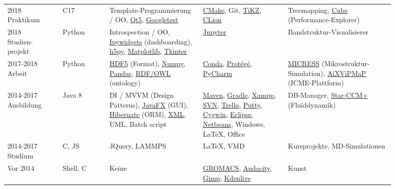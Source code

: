 \documentclass[11pt,a4paper]{moderncv}
\def\SymboCpp{C\raisebox{0.5ex}{\tiny\textbf{++}}}
\begin{document}
\begin{center}
{\begin{tabular}{p{0.13\linewidth} p{0.11\linewidth} >{\raggedright\arraybackslash}p{0.22\linewidth} >{\raggedright\arraybackslash}p{0.2\linewidth} >{\raggedright\arraybackslash}p{0.25\linewidth}}
      \makecell[l]{2018 \\ Praktikum} & \SymboCpp{}17 & Template-Programmierung / OO, \href{https://www.qt.io/}{Qt5}, \href{https://github.com/google/googletest}{Googletest} & \href{https://cmake.org/}{CMake}, Git, \href{https://texample.net/tikz/}{TiKZ}, \href{https://www.jetbrains.com/clion/}{CLion} & Treemapping, \href{https://www.scalasca.org/software/cube-4.x/}{Cube} (Performance-Explorer)\\
      \makecell[l]{2018 \\Studien- \\ projekt} & Python & Introspection / OO, \href{https://github.com/jupyter-widgets/ipywidgets}{Ipywidgets} (dashboarding), \href{https://www.h5py.org/}{h5py}, \href{https://matplotlib.org/}{Matplotlib}, \href{https://docs.python.org/3/library/tk.html}{Tkinter} & \href{https://jupyter.org/}{Jupyter} & Bandstruktur-Visualisierer\\
      \makecell[l]{2017-2018 \\ Arbeit} & Python & \href{https://www.hdfgroup.org/solutions/hdf5/}{HDF5} (Format), \href{https://numpy.org}{Numpy}, \href{https://pandas.pydata.org/}{Pandas}, \href{https://www.w3.org/OWL/}{RDF/OWL} (ontology) & \href{https://anaconda.org/conda-forge/}{Conda}, \href{https://protege.stanford.edu/}{Protégé}, \href{https://www.jetbrains.com/pycharm/}{PyCharm} & \href{https://micress.rwth-aachen.de/}{MICRESS} (Mikrostruktur-Simulation), \href{aixvipmap.de}{AiXViPMaP} (ICME-Plattform)\\
      2014-2017 Ausbildung & Java 8 & DI / MVVM (Design Patterns), \href{https://openjfx.io/}{JavaFX} (GUI), \href{https://hibernate.org/}{Hibernate} (ORM), \href{https://www.w3.org/TR/xml/}{XML}, UML, Batch script & \href{https://maven.apache.org/}{Maven}, \href{https://gradle.org/}{Gradle}, \href{https://www.apachefriends.org/index.html}{Xampp}, \href{https://subversion.apache.org/}{SVN}, \href{https://trello.com/}{Trello}, \href{https://www.putty.org/}{Putty}, \href{https://cygwin.com/}{Cygwin}, \href{https://www.eclipse.org/}{Eclipse}, \href{https://netbeans.apache.org//}{Netbeans}, Windows, \LaTeX{}, Office & DB-Manager, \href{https://www.plm.automation.siemens.com/global/en/products/simcenter/STAR-CCM.html}{Star-CCM+} (Fluiddynamik)\\
      2014-2017 Studium & \SymboCpp{}, JS & JQuery, LAMMPS & \LaTeX{}, VMD & Kursprojekte, MD-Simulationen\\
      Vor 2014 & Shell, \SymboCpp{} & Keine & \href{https://www.gromacs.org/}{GROMACS}, \href{https://www.audacityteam.org/}{Audacity}, \href{https://www.gimp.org}{Gimp}, \href{https://kdenlive.org}{Kdenlive} & Kunst\\
    \end{tabular}
  }
\end{center}
\end{document}
